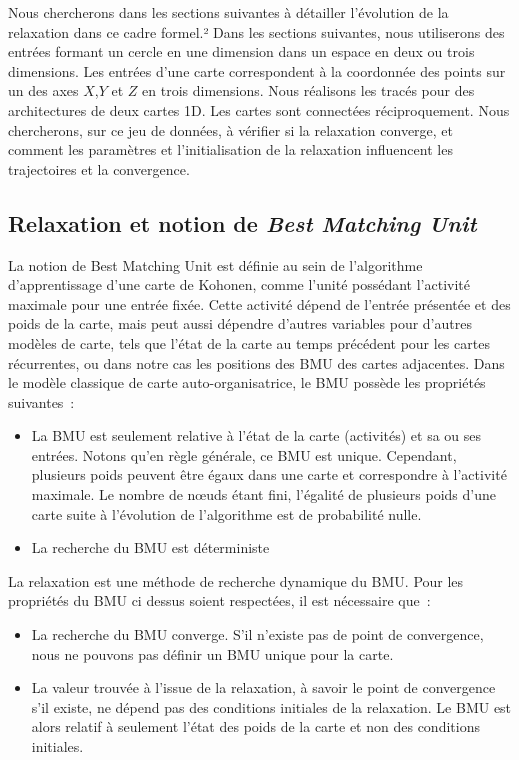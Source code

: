 \documentclass[../main]{subfiles}
\begin{document}
Nous chercherons dans les sections suivantes à détailler l'évolution de la relaxation dans ce cadre formel.²
Dans les sections suivantes, nous utiliserons des entrées formant un cercle en une dimension dans un espace en deux ou trois dimensions. Les entrées d'une carte correspondent à la coordonnée des points sur un des axes $X$,$Y$ et $Z$ en trois dimensions.
Nous réalisons les tracés pour des architectures de deux cartes 1D. Les cartes sont connectées réciproquement.
Nous chercherons, sur ce jeu de données, à vérifier si la relaxation converge, et comment les paramètres et l'initialisation de la relaxation influencent les trajectoires et la convergence.

\subsection{Relaxation et notion de \emph{Best Matching Unit}}

La notion de Best Matching Unit est définie au sein de l'algorithme d'apprentissage d'une carte de Kohonen, comme l'unité possédant l'activité maximale pour une entrée fixée. 
Cette activité dépend de l'entrée présentée et des poids de la carte, mais peut aussi dépendre d'autres variables pour d'autres modèles de carte, tels que l'état de la carte au temps précédent pour les cartes récurrentes, ou dans notre cas les positions des BMU des cartes adjacentes.
Dans le modèle classique de carte auto-organisatrice, le BMU possède les propriétés suivantes~:
\begin{itemize}
	\item La BMU est seulement relative à l'état de la carte (activités) et sa ou ses entrées. Notons qu'en règle générale, ce BMU est unique. Cependant, plusieurs poids peuvent être égaux dans une carte et correspondre à l'activité maximale. Le nombre de n\oe{}uds étant fini, l'égalité de plusieurs poids d'une carte suite à l'évolution de l'algorithme est de probabilité nulle.
	\item La recherche du BMU est déterministe
\end{itemize}

La relaxation est une méthode de recherche dynamique du BMU. Pour les propriétés du BMU ci dessus soient respectées, il est nécessaire que~: 
\begin{itemize}
	\item La recherche du BMU converge. S'il n'existe pas de point de convergence, nous ne pouvons pas définir un BMU unique pour la carte. 
	\item La valeur trouvée à l'issue de la relaxation, à savoir le point de convergence s'il existe, ne dépend pas des conditions initiales de la relaxation. Le BMU est alors relatif à seulement l'état des poids de la carte et non des conditions initiales.
\end{itemize}
\end{document}
